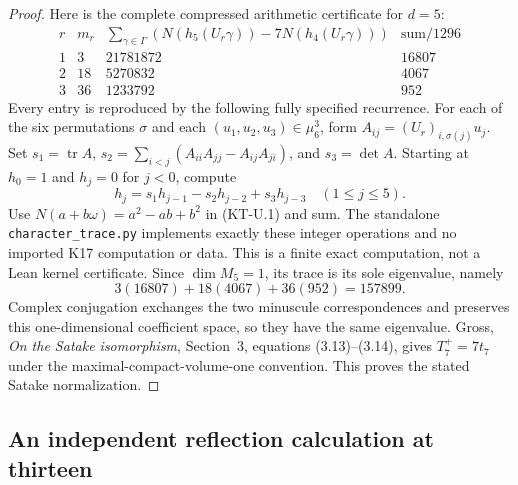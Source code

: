 \begin{proof}
Here is the complete compressed arithmetic certificate for $d=5$:
\[
\begin{array}{c|r|r|r}
r&m_r&\displaystyle\sum_{\gamma\in\Gamma}
       (N(h_5(U_r\gamma))-7N(h_4(U_r\gamma)))
       &\text{sum}/1296\\\hline
1&3&21781872&16807\\
2&18&5270832&4067\\
3&36&1233792&952
\end{array}
\]
Every entry is reproduced by the following fully specified recurrence.
For each of the six permutations $\sigma$ and each
$(u_1,u_2,u_3)\in\mu_6^3$, form $A_{ij}=(U_r)_{i,\sigma(j)}u_j$.
Set $s_1=\operatorname{tr}A$,
$s_2=\sum_{i<j}(A_{ii}A_{jj}-A_{ij}A_{ji})$, and $s_3=\det A$.
Starting at $h_0=1$ and $h_j=0$ for $j<0$, compute
\[
             h_j=s_1h_{j-1}-s_2h_{j-2}+s_3h_{j-3}
             \quad(1\leq j\leq5).
\]
Use $N(a+b\omega)=a^2-ab+b^2$ in (KT-U.1) and sum.
The standalone \texttt{character\_trace.py} implements exactly
these integer operations and no imported K17 computation or data.
This is a finite exact computation, not a Lean kernel certificate.
Since $\dim M_5=1$, its trace is its sole eigenvalue, namely
\[
           3(16807)+18(4067)+36(952)=157899.
\]
Complex conjugation exchanges the two minuscule correspondences
and preserves this one-dimensional coefficient space, so they have
the same eigenvalue. Gross, \emph{On the Satake isomorphism},
Section~3, equations (3.13)--(3.14), gives $T_7^+=7t_7$ under
the maximal-compact-volume-one convention. This proves the stated
Satake normalization.
\end{proof}

\subsection{An independent reflection calculation at thirteen}

